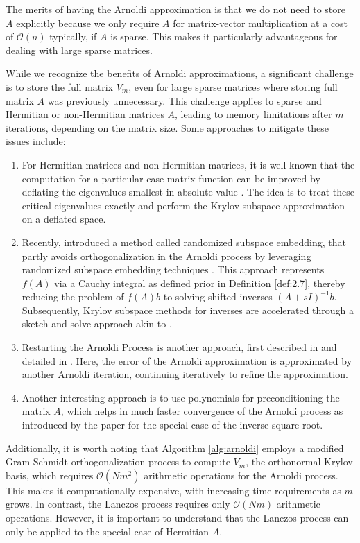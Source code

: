 The merits of having the Arnoldi approximation is that we do not need to store $A$ explicitly because we only require $A$ for matrix-vector multiplication at a cost of $\mathcal{O}(n)$ typically, if $A$ is sparse. This makes it particularly advantageous for dealing with large sparse matrices.

While we recognize the benefits of Arnoldi approximations, a significant challenge is to store the full matrix $V_m$, even for large sparse matrices where storing full matrix $A$ was previously unnecessary. This challenge applies to sparse and Hermitian or non-Hermitian matrices $A$, leading to memory limitations after $m$ iterations, depending on the matrix size. Some approaches to mitigate these issues include:

\begin{enumerate}
    \item For Hermitian matrices and non-Hermitian matrices, it is well known that the computation for a particular case matrix function can be improved by deflating the eigenvalues smallest in absolute value \cite{10}. The idea is to treat these critical eigenvalues exactly and perform the Krylov subspace approximation on a deflated space.
    \item Recently, \cite{41} introduced a method called randomized subspace embedding, that partly avoids orthogonalization in the Arnoldi process by leveraging randomized subspace embedding techniques \cite{42}. This approach represents $f(A)$ via a Cauchy integral as defined prior in Definition \ref{def:2.7}, thereby reducing the problem of $f(A)b$ to solving shifted inverses $(A + sI)^{-1}b$. Subsequently, Krylov subspace methods for inverses are accelerated through a sketch-and-solve approach akin to \cite{43}.
    
    \item Restarting the Arnoldi Process is another approach, first described in \cite{44} and detailed in \cite{45}. Here, the error of the Arnoldi approximation is approximated by another Arnoldi iteration, continuing iteratively to refine the approximation.

    \item Another interesting approach is to use polynomials for preconditioning the matrix $A$, which helps in much faster convergence of the Arnoldi process as introduced by the paper \cite{49} for the special case of the inverse square root.
\end{enumerate}

Additionally, it is worth noting that Algorithm \ref{alg:arnoldi} employs a modified Gram-Schmidt orthogonalization process to compute $V_m$, the orthonormal Krylov basis, which requires $\mathcal{O}(Nm^2)$ arithmetic operations for the Arnoldi process. This makes it computationally expensive, with increasing time requirements as $m$ grows. In contrast, the Lanczos process requires only $\mathcal{O}(Nm)$ arithmetic operations. However, it is important to understand that the Lanczos process can only be applied to the special case of Hermitian $A$.

